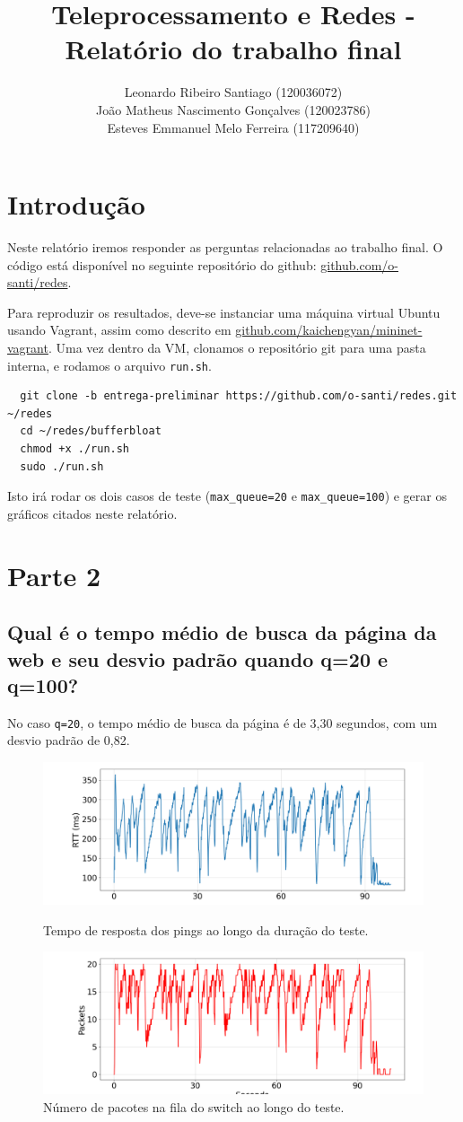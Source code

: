 \documentclass[a4paper,12pt]{article}
\title{Teleprocessamento e Redes - Relatório do trabalho final}
\author{
  Leonardo Ribeiro Santiago (120036072) \\
  João Matheus Nascimento Gonçalves (120023786) \\
  Esteves Emmanuel Melo Ferreira (117209640) }
\date{}
\newcommand{\code}[1]{\texttt{#1}}
\begin{document}
\maketitle

\section{Introdução}

Neste relatório iremos responder as perguntas relacionadas ao trabalho final. O código está disponível no seguinte repositório do github: {\color{blue} \href{https://github.com/o-santi/redes}{github.com/o-santi/redes}}.

Para reproduzir os resultados, deve-se instanciar uma máquina virtual Ubuntu usando Vagrant, assim como descrito em {\color{blue} \href{https://github.com/kaichengyan/mininet-vagrant}{github.com/kaichengyan/mininet-vagrant}}. Uma vez dentro da VM, clonamos o repositório git para uma pasta interna, e rodamos o arquivo \code{run.sh}.
\begin{verbatim}
  git clone -b entrega-preliminar https://github.com/o-santi/redes.git ~/redes
  cd ~/redes/bufferbloat
  chmod +x ./run.sh
  sudo ./run.sh
\end{verbatim}

Isto irá rodar os dois casos de teste (\code{max\_queue=20} e \code{max\_queue=100}) e gerar os gráficos citados neste relatório.

\section{Parte 2}

\subsection{Qual é o tempo médio de busca da página da web e seu desvio padrão quando q=20 e q=100?}

No caso \code{q=20}, o tempo médio de busca da página é de 3,30 segundos, com um desvio padrão de 0,82.
\begin{figure}[h!]
  \centering
  \includegraphics[width=0.5\columnwidth]{./bufferbloat/bb-q20/reno-rtt-q20.png}
  \caption{Tempo de resposta dos pings ao longo da duração do teste.}
  \includegraphics[width=0.5\columnwidth]{./bufferbloat/bb-q20/reno-buffer-q20.png}
  \caption{Número de pacotes na fila do switch ao longo do teste.}
\end{figure}
\end{document}
